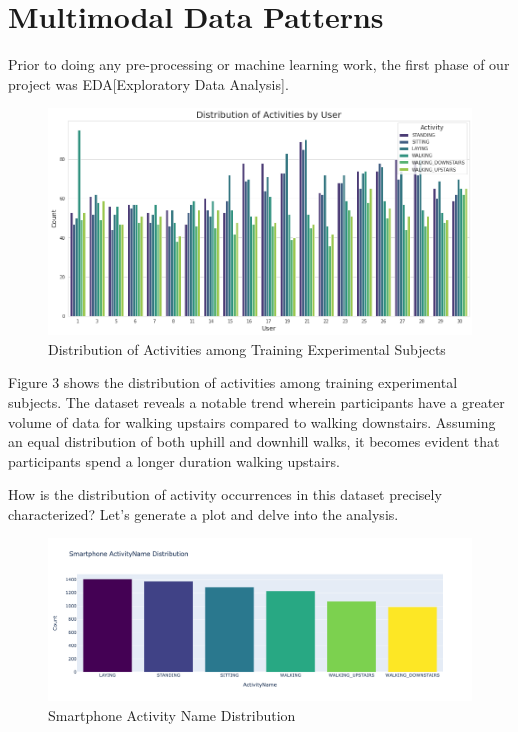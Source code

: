 \documentclass[11pt]{article}
\begin{document}
\section{Multimodal Data Patterns}
Prior to doing any pre-processing or machine learning work, the first phase of our project was EDA[Exploratory Data Analysis]. 

\begin{figure}[h!]
	\includegraphics[width= 1.0 \linewidth]{activity_distribution.png}
	\centering
	\caption{Distribution of Activities among Training Experimental Subjects}
	\label{activity_distribution.png}
\end{figure}

Figure 3 shows the distribution of activities among training experimental subjects. The dataset reveals a notable trend wherein participants have a greater volume of data for walking upstairs compared to walking downstairs. Assuming an equal distribution of both uphill and downhill walks, it becomes evident that participants spend a longer duration walking upstairs. \newline 

How is the distribution of activity occurrences in this dataset precisely characterized? Let's generate a plot and delve into the analysis.

\begin{figure}[h!]
	\includegraphics[width= 1.0 \linewidth]{smartphone_activity_name_distribution.png}
	\centering
	\caption{Smartphone Activity Name Distribution}
	\label{smartphone_activity_name_distribution.png}
\end{figure}
\end{document}
